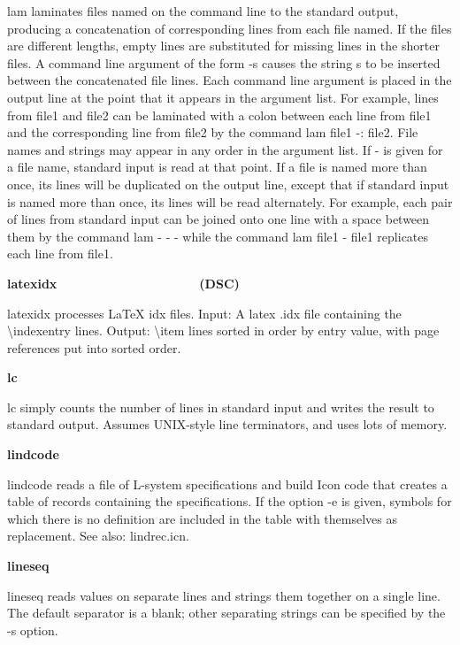 {\textsf{lam} laminates files named on the command line to the standard
output, producing a concatenation of corresponding lines from each file
named. If the files are different lengths, empty lines are substituted
for missing lines in the shorter files. A command line argument of the
form \textsf{{}-s} causes the string \textsf{s} to be inserted between
the concatenated file lines. Each command line argument is placed in
the output line at the point that it appears in the argument list. For
example, lines from file1 and file2 can be laminated with a colon
between each line from file1 and the corresponding line from file2 by
the command lam file1 -: file2. File names and strings may appear in
any order in the argument list. If - is given for a file name, standard
input is read at that point. If a file is named more than once, its
lines will be duplicated on the output line, except that if standard
input is named more than once, its lines will be read alternately. For
example, each pair of lines from standard input can be joined onto one
line with a space between them by the command lam - {\textquotedbl}-
{\textquotedbl} - while the command lam file1 {\textquotedbl}-
{\textquotedbl} file1 replicates each line from file1.

{\sffamily\bfseries
latexidx\ \ \ \ \ \ \ \ \ \ \ \ \ \ \ \ \ \ \ \ (DSC)}

\textsf{latexidx} processes LaTeX idx files. Input: A latex
.idx file containing the {\textbackslash}indexentry lines. Output:
{\textbackslash}item lines sorted in order by entry value, with page
references put into sorted order. 

{\sffamily\bfseries
lc\ \ \ \ \ \ \ \ \ \ \ \ \ \ \ \ \ \ \ \ \ \ }

\textsf{lc} simply counts the number of lines in standard input and
writes the result to standard output. Assumes UNIX-style line
terminators, and uses lots of memory. 

{\sffamily\bfseries
lindcode\ \ \ \ \ \ \ \ \ \ \ \ \ \ \ \ \ \ \ \ }

\textsf{lindcode} reads a file of L-system specifications and build Icon
code that creates a table of records containing the specifications. If
the option -e is given, symbols for which there is no definition are
included in the table with themselves as replacement. See also:
\textsf{lindrec.icn}.

{\sffamily\bfseries
lineseq\ \ \ \ \ \ \ \ \ \ \ \ \ \ \ \ \ \ \ \ }

\textsf{lineseq} reads values on separate lines and strings them
together on a single line. The default separator is a blank; other
separating strings can be specified by the \textsf{{}-s} option.

}
